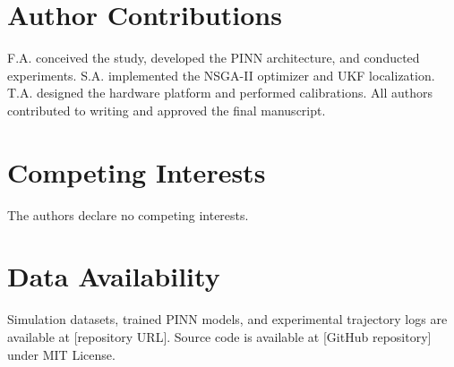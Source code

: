 \documentclass[pdflatex,sn-nature]{sn-jnl}%
\begin{document}
\section*{Author Contributions}
F.A. conceived the study, developed the PINN architecture, and conducted experiments. S.A. implemented the NSGA-II optimizer and UKF localization. T.A. designed the hardware platform and performed calibrations. All authors contributed to writing and approved the final manuscript.

\section*{Competing Interests}
The authors declare no competing interests.

\section*{Data Availability}
Simulation datasets, trained PINN models, and experimental trajectory logs are available at [repository URL]. Source code is available at [GitHub repository] under MIT License.
\end{document}
